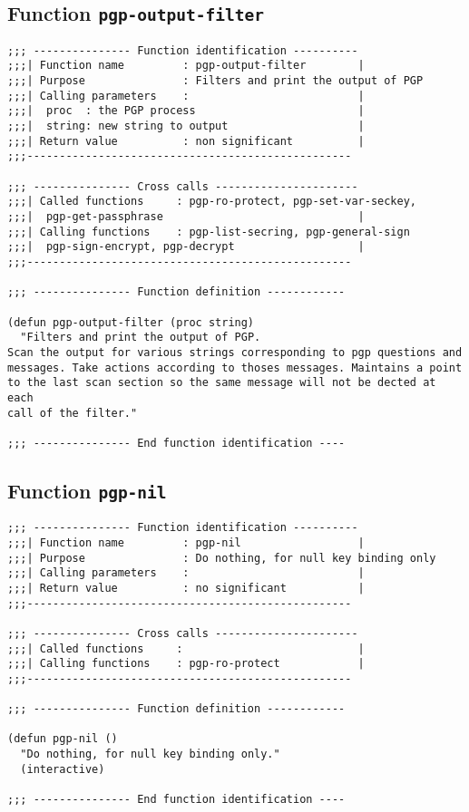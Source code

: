 \subsection{Function {\tt pgp-output-filter}}
\leavevmode
\begin{verbatim}
;;; --------------- Function identification ----------
;;;| Function name         : pgp-output-filter        |
;;;| Purpose               : Filters and print the output of PGP
;;;| Calling parameters    :                          |
;;;|  proc  : the PGP process                         |
;;;|  string: new string to output                    |
;;;| Return value          : non significant          |
;;;--------------------------------------------------

;;; --------------- Cross calls ----------------------
;;;| Called functions     : pgp-ro-protect, pgp-set-var-seckey,
;;;|  pgp-get-passphrase                              |
;;;| Calling functions    : pgp-list-secring, pgp-general-sign
;;;|  pgp-sign-encrypt, pgp-decrypt                   |
;;;--------------------------------------------------

;;; --------------- Function definition ------------

(defun pgp-output-filter (proc string)
  "Filters and print the output of PGP.
Scan the output for various strings corresponding to pgp questions and
messages. Take actions according to thoses messages. Maintains a point
to the last scan section so the same message will not be dected at each
call of the filter."

;;; --------------- End function identification ----
\end{verbatim}
\subsection{Function {\tt pgp-nil}}
\leavevmode
\begin{verbatim}
;;; --------------- Function identification ----------
;;;| Function name         : pgp-nil                  |
;;;| Purpose               : Do nothing, for null key binding only
;;;| Calling parameters    :                          |
;;;| Return value          : no significant           |
;;;--------------------------------------------------

;;; --------------- Cross calls ----------------------
;;;| Called functions     :                           |
;;;| Calling functions    : pgp-ro-protect            |
;;;--------------------------------------------------

;;; --------------- Function definition ------------

(defun pgp-nil ()
  "Do nothing, for null key binding only."
  (interactive)

;;; --------------- End function identification ----
\end{verbatim}
